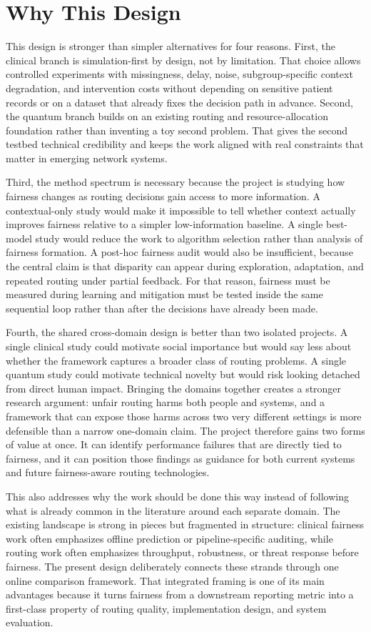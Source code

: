 \documentclass{IEEEtran}
\begin{document}
\section{Why This Design}
This design is stronger than simpler alternatives for four reasons. First, the clinical branch is simulation-first by design, not by limitation. That choice allows controlled experiments with missingness, delay, noise, subgroup-specific context degradation, and intervention costs without depending on sensitive patient records or on a dataset that already fixes the decision path in advance. Second, the quantum branch builds on an existing routing and resource-allocation foundation rather than inventing a toy second problem. That gives the second testbed technical credibility and keeps the work aligned with real constraints that matter in emerging network systems.

Third, the method spectrum is necessary because the project is studying how fairness changes as routing decisions gain access to more information. A contextual-only study would make it impossible to tell whether context actually improves fairness relative to a simpler low-information baseline. A single best-model study would reduce the work to algorithm selection rather than analysis of fairness formation. A post-hoc fairness audit would also be insufficient, because the central claim is that disparity can appear during exploration, adaptation, and repeated routing under partial feedback. For that reason, fairness must be measured during learning and mitigation must be tested inside the same sequential loop rather than after the decisions have already been made.

Fourth, the shared cross-domain design is better than two isolated projects. A single clinical study could motivate social importance but would say less about whether the framework captures a broader class of routing problems. A single quantum study could motivate technical novelty but would risk looking detached from direct human impact. Bringing the domains together creates a stronger research argument: unfair routing harms both people and systems, and a framework that can expose those harms across two very different settings is more defensible than a narrow one-domain claim. The project therefore gains two forms of value at once. It can identify performance failures that are directly tied to fairness, and it can position those findings as guidance for both current systems and future fairness-aware routing technologies.

This also addresses why the work should be done this way instead of following what is already common in the literature around each separate domain. The existing landscape is strong in pieces but fragmented in structure: clinical fairness work often emphasizes offline prediction or pipeline-specific auditing, while routing work often emphasizes throughput, robustness, or threat response before fairness. The present design deliberately connects these strands through one online comparison framework. That integrated framing is one of its main advantages because it turns fairness from a downstream reporting metric into a first-class property of routing quality, implementation design, and system evaluation.
\end{document}
